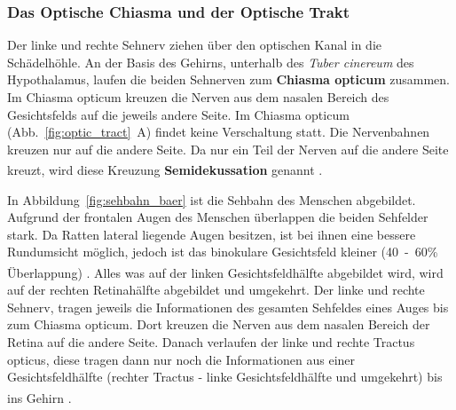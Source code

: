 \documentclass[12pt,a4paper,pdftex]{article}
\begin{document}
\subsubsection*{Das Optische Chiasma und der Optische Trakt}

Der linke und rechte Sehnerv ziehen über den optischen Kanal in die Schädelhöhle. An der Basis des Gehirns, unterhalb des \textit{Tuber cinereum} des Hypothalamus, laufen die beiden Sehnerven zum \textbf{Chiasma opticum}  zusammen. 
Im Chiasma opticum kreuzen die Nerven aus dem nasalen Bereich des Gesichtsfelds auf die jeweils andere Seite. Im Chiasma opticum (Abb.~\ref{fig:optic_tract}~A) findet keine Verschaltung statt. Die Nervenbahnen kreuzen nur auf die andere Seite.
Da nur ein Teil der Nerven auf die andere Seite kreuzt, wird diese Kreuzung \textbf{Semidekussation}  genannt \textsuperscript{\cite[15]{crossman2014neuroanatomy}}. 

In Abbildung~\ref{fig:sehbahn_baer} ist die Sehbahn des Menschen abgebildet. Aufgrund der frontalen Augen des Menschen überlappen die beiden Sehfelder stark. Da Ratten lateral liegende Augen besitzen, ist bei ihnen eine bessere Rundumsicht möglich, jedoch ist das binokulare Gesichtsfeld kleiner (40~-~60\% Überlappung) \textsuperscript{\cite[30]{paxinos2014rat}}.
Alles was auf der linken Gesichtsfeldhälfte abgebildet wird, wird auf der rechten Retinahälfte abgebildet und umgekehrt. Der linke und rechte Sehnerv, tragen jeweils die Informationen des gesamten Sehfeldes eines Auges bis zum Chiasma opticum. Dort kreuzen die Nerven aus dem nasalen Bereich der Retina auf die andere Seite. Danach verlaufen der linke und rechte Tractus opticus,  diese tragen dann nur noch die Informationen aus einer Gesichtsfeldhälfte (rechter Tractus - linke Gesichtsfeldhälfte und umgekehrt) bis ins Gehirn \textsuperscript{\cite[15]{crossman2014neuroanatomy}}.
\end{document}
